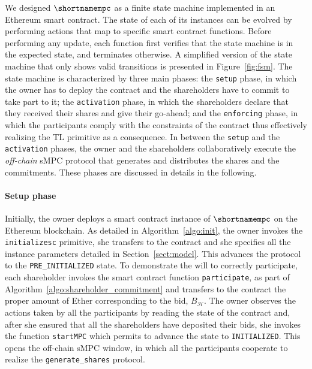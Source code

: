 We designed $\shortnamempc$ as a finite state machine implemented in an Ethereum smart contract.
The state of each of its instances can be evolved by performing actions that map to specific smart contract functions.
Before performing any update, each function first verifies that the state machine is in the expected state, and terminates otherwise.
A simplified version of the state machine that only shows valid transitions is presented in Figure~\ref{fig:fsm}.
The state machine is characterized by three main phases: the \texttt{setup} phase, in which the owner has to deploy the contract and the shareholders have to commit to take part to it; the \texttt{activation} phase, in which the shareholders declare that they received their shares and give their go-ahead; and the \texttt{enforcing} phase, in which the participants comply with the constraints of the contract thus effectively realizing the TL primitive as a consequence.
%
%
In between the \texttt{setup} and the \texttt{activation} phases, the owner and the shareholders collaboratively execute the {\em off-chain} sMPC protocol that generates and distributes the shares and the commitments.
These phases are discussed in details in the following.

\medskip

\paragraph*{Setup phase}
Initially, the owner deploys a smart contract instance of $\shortnamempc$ on the Ethereum blockchain.
As detailed in Algorithm~\ref{algo:init}, the owner invokes the \texttt{initialize\textunderscore sc} primitive, she transfers \PO to the contract and she specifies all the instance parameters detailed in Section~\ref{sect:model}.
This advances the protocol to the \texttt{PRE\_INITIALIZED} state. 
To demonstrate the will to correctly participate, each shareholder invokes the smart contract function \texttt{participate}, as part of Algorithm~\ref{algo:shareholder_commitment} and transfers to the contract the proper amount of Ether corresponding to the bid, $B_{\mathcal{H}}$. 
The owner observes the actions taken by all the participants by reading the state of the contract and, after she ensured that all the shareholders have deposited their bids, she invokes the function \texttt{startMPC} which permits to advance the state to \texttt{INITIALIZED}.
This opens the off-chain sMPC window, in which all the participants cooperate to realize the \texttt{generate\_shares} protocol.

